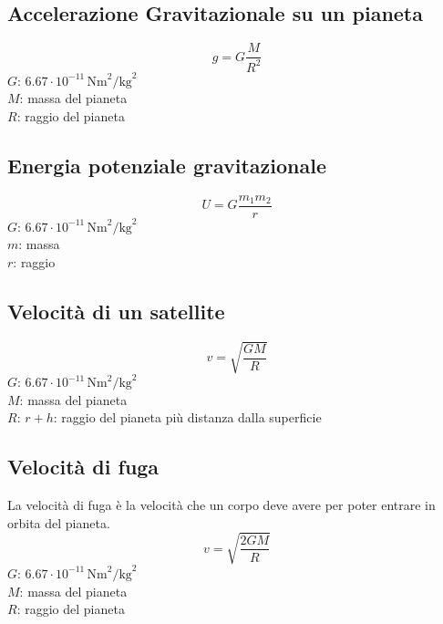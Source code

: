 \subsection{Accelerazione Gravitazionale su un pianeta}
\begin{equation*}
g = G\frac{M}{R^2}
\end{equation*}
\hyperref[tab:G]{$G$}: $6.67\cdot10^{-11}\,\text{Nm}^2\text{/kg}^2$\\
$M$: massa del pianeta\\
$R$: raggio del pianeta

\subsection{Energia potenziale gravitazionale}
\begin{equation*}
  U = G \frac{m_1m_2}{r}
\end{equation*}
\hyperref[tab:G]{$G$}: $6.67\cdot10^{-11}\,\text{Nm}^2\text{/kg}^2$\\
$m$: massa\\
$r$: raggio

\subsection{Velocità di un satellite}
\begin{equation*}
v = \sqrt{\frac{GM}{R}}
\end{equation*}
\hyperref[tab:g]{$G$}: $6.67\cdot10^{-11}\,\text{Nm}^2\text{/kg}^2$\\
$M$: massa del pianeta\\
$R$: $r + h$: raggio del pianeta più distanza dalla superficie

\subsection{Velocità di fuga}
La velocità di fuga è la velocità che un corpo deve avere per poter entrare in orbita del pianeta.
\begin{equation*}
v = \sqrt{\frac{2GM}{R}}
\end{equation*}
\hyperref[tab:g]{$G$}: $6.67\cdot10^{-11}\,\text{Nm}^2\text{/kg}^2$\\
$M$: massa del pianeta\\
$R$: raggio del pianeta\\
